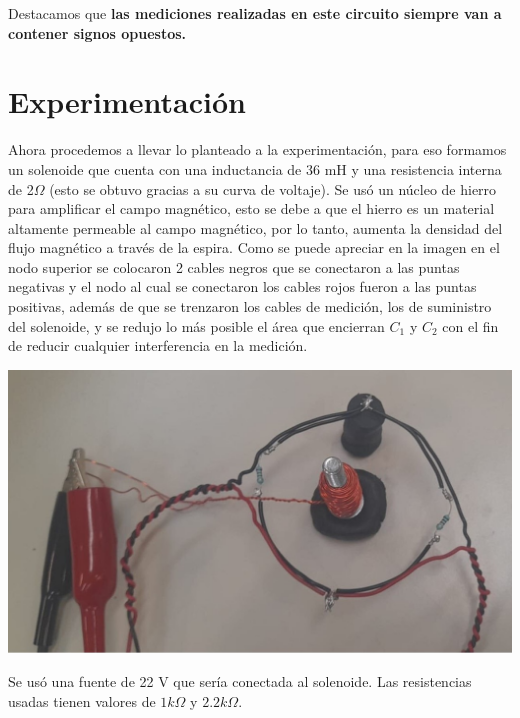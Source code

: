 \documentclass[a0,portrait]{a0poster}
\begin{document}
\begin{multicols}{2}
\noindent Destacamos que \textbf{las mediciones realizadas en este circuito siempre van a contener signos opuestos.}

\section*{Experimentación}

\noindent Ahora procedemos a llevar lo planteado a la experimentación, para eso formamos un solenoide  que cuenta con una inductancia de 36 mH y una resistencia interna de 2$\Omega$ (esto se obtuvo gracias a su curva de voltaje). Se usó un núcleo  de hierro para amplificar el campo magnético, esto se debe a que el hierro es un material altamente permeable al campo magnético, por lo tanto, aumenta la densidad del flujo magnético a través de la espira. Como se puede apreciar en la imagen en el nodo superior se colocaron 2 cables negros que se conectaron a las puntas negativas y el nodo al cual se conectaron los cables rojos fueron a las puntas positivas, además de que se trenzaron los cables de medición, los de suministro del solenoide, y se redujo lo más posible el área que encierran $C_1$ y $C_2$ con el fin de reducir cualquier interferencia en la medición.

\begin{center}\vspace{0.4cm}
    \includegraphics[scale=0.5]{Circuito2.jpg}
\end{center}\vspace{0.4cm} 


\noindent Se usó una fuente de 22 V que sería conectada al solenoide. Las resistencias usadas tienen valores de $1k\Omega$ y $2.2k\Omega$.


\end{multicols}
\end{document}
